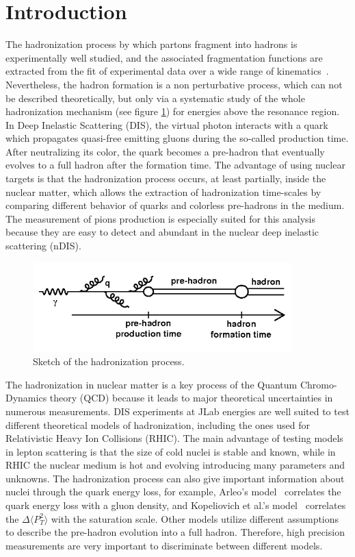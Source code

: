 
\section{Introduction}
\label{physics}

The hadronization process by which partons fragment into hadrons is 
experimentally well studied, and the associated fragmentation functions are extracted from the fit of experimental data over a wide range of kinematics~\cite{Albino:2008fy}. Nevertheless, the hadron formation is a non perturbative process, which can not be described theoretically, but only via a systematic study of the whole hadronization mechanism (see figure \ref{fig:hadro}) for energies above the resonance region. In Deep Inelastic Scattering (DIS), the virtual photon interacts with a quark which propagates quasi-free emitting gluons during the so-called production time. After neutralizing its color, the quark becomes a pre-hadron that eventually evolves to a full hadron after the formation time. The advantage of using nuclear targets is that the hadronization process occurs, at least partially, inside the nuclear matter, which allows the extraction of hadronization time-scales by comparing different behavior of quarks and colorless pre-hadrons in the medium. The measurement of pions production is especially suited for this analysis because they are easy to detect and abundant in the nuclear deep inelastic scattering (nDIS).

\begin{figure}[htbp]
\centering
\includegraphics[width=10cm] {fig/hadro.png} 
\caption {Sketch of the hadronization process.}
\label{fig:hadro}
\end{figure}

The hadronization in nuclear matter is a key process of the Quantum 
Chromo-Dynamics theory (QCD) because it leads to major theoretical 
uncertainties in numerous measurements. DIS experiments at JLab energies are 
well suited to test different theoretical models of hadronization, including 
the ones used for Relativistic Heavy Ion Collisions (RHIC). The main advantage 
of testing models in lepton scattering is that the size of cold nuclei is 
stable and known, while in RHIC the nuclear medium is hot and evolving 
introducing many parameters and unknowns. The hadronization process can also 
give important information about nuclei through the quark energy loss, for example, Arleo's model~\cite{Arleo:2003yf} correlates the quark energy loss with a gluon density, and Kopeliovich et al.'s model~\cite{Kopeliovich:2010aa} correlates the $\Delta \langle P_T^2 \rangle$ with the saturation scale. Other models \cite{Gallmeister:2007an} utilize different assumptions to describe the pre-hadron evolution into a full hadron. Therefore, high precision measurements are very important to discriminate between different models. 

